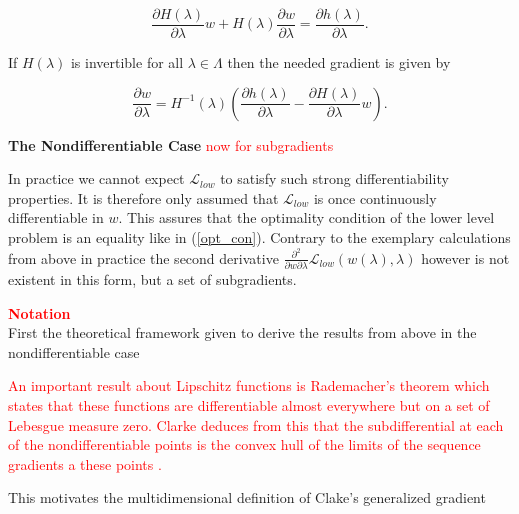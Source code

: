 \begin{equation*}
	\frac{\partial H(\lambda)}{\partial \lambda}w+H(\lambda)\frac{\partial w}{\partial \lambda} = \frac{\partial h(\lambda)}{\partial  \lambda}.
\end{equation*}

If \(H(\lambda)\) is invertible for all \(\lambda \in \Lambda\) then the needed gradient is given by 

\begin{equation*}
	\frac{\partial w}{\partial \lambda} = H^{-1}(\lambda)\left(\frac{\partial h(\lambda)}{\partial \lambda}-\frac{\partial H(\lambda)}{\partial \lambda}w\right).
\end{equation*}


\textbf{The Nondifferentiable Case}
\textcolor{red}{now for subgradients}

In practice we cannot expect \(\mathcal{L}_{low}\) to satisfy such strong differentiability properties.
It is therefore only assumed that \(\mathcal{L}_{low}\) is once continuously differentiable in \(w\). This assures that the optimality condition of the lower level problem is an equality like in (\ref{opt_con}).
Contrary to the exemplary calculations from above in practice the second derivative \(\frac{\partial^2}{\partial w \partial \lambda} \mathcal{L}_{low}(w(\lambda),\lambda)\) however is not existent in this form, but a set of subgradients.



\textcolor{red}{\textbf{Notation}}\\
First the theoretical framework given to derive the results from above in the nondifferentiable case



\textcolor{red}{An important result about Lipschitz functions is Rademacher's theorem which states that these functions are differentiable almost everywhere but on a set of Lebesgue measure zero\cite[Theorem 3.1]{Heinonen2004}. 
Clarke deduces from this that the subdifferential at each of the nondifferentiable points is the convex hull of the limits of the sequence gradients a these points \cite[see Theorem 2.5.1]{Clarke1990}.}

This motivates the multidimensional definition of Clake's generalized gradient 

